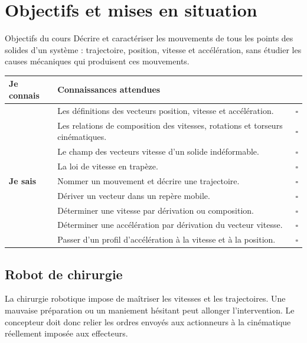 
\section{Objectifs et mises en situation}
\label{sec:cine-objectifs}

\begin{TLCineMethod}{Objectifs du cours}
Décrire et caractériser les mouvements de tous les points des solides
d'un système : trajectoire, position, vitesse et accélération, sans
étudier les causes mécaniques qui produisent ces mouvements.
\end{TLCineMethod}

\begin{center}
\small
\begin{tabularx}{\linewidth}{>{\bfseries}p{2cm}X c}
\toprule
Je connais & Connaissances attendues & \\
\midrule
& Les définitions des vecteurs position, vitesse et accélération. & $\square$\\
& Les relations de composition des vitesses, rotations et torseurs cinématiques. & $\square$\\
& Le champ des vecteurs vitesse d'un solide indéformable. & $\square$\\
& La loi de vitesse en trapèze. & $\square$\\
\midrule
Je sais & Nommer un mouvement et décrire une trajectoire. & $\square$\\
& Dériver un vecteur dans un repère mobile. & $\square$\\
& Déterminer une vitesse par dérivation ou composition. & $\square$\\
& Déterminer une accélération par dérivation du vecteur vitesse. & $\square$\\
& Passer d'un profil d'accélération à la vitesse et à la position. & $\square$\\
\bottomrule
\end{tabularx}
\end{center}

\subsection{Robot de chirurgie}

La chirurgie robotique impose de maîtriser les vitesses et les
trajectoires. Une mauvaise préparation ou un maniement hésitant peut
allonger l'intervention. Le concepteur doit donc relier les ordres
envoyés aux actionneurs à la cinématique réellement imposée aux
effecteurs.

